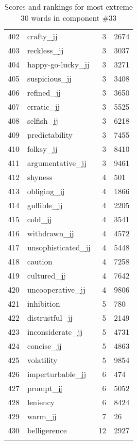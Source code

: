 \begin{longtable}[!htbp]{| rlr@{.}l |}
    402 & crafty\_jj & 3 & 2674 \\
    403 & reckless\_jj & 3 & 3037 \\
    404 & happy-go-lucky\_jj & 3 & 3271 \\
    405 & suspicious\_jj & 3 & 3408 \\
    406 & refined\_jj & 3 & 3650 \\
    407 & erratic\_jj & 3 & 5525 \\
    408 & selfish\_jj & 3 & 6218 \\
    409 & predictability & 3 & 7455 \\
    410 & folksy\_jj & 3 & 8410 \\
    411 & argumentative\_jj & 3 & 9461 \\
    412 & shyness & 4 & 501 \\
    413 & obliging\_jj & 4 & 1866 \\
    414 & gullible\_jj & 4 & 2205 \\
    415 & cold\_jj & 4 & 3541 \\
    416 & withdrawn\_jj & 4 & 4572 \\
    417 & unsophisticated\_jj & 4 & 5448 \\
    418 & caution & 4 & 7258 \\
    419 & cultured\_jj & 4 & 7642 \\
    420 & uncooperative\_jj & 4 & 9806 \\
    421 & inhibition & 5 & 780 \\
    422 & distrustful\_jj & 5 & 2149 \\
    423 & inconsiderate\_jj & 5 & 4731 \\
    424 & concise\_jj & 5 & 4863 \\
    425 & volatility & 5 & 9854 \\
    426 & imperturbable\_jj & 6 & 474 \\
    427 & prompt\_jj & 6 & 5052 \\
    428 & leniency & 6 & 8424 \\
    429 & warm\_jj & 7 & 26 \\
    430 & belligerence & 12 & 2927 \\
    \hline
    \caption{Scores and rankings for most extreme 30 words in component \#33} \\
\end{longtable}
